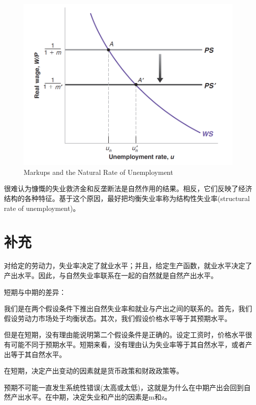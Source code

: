 \documentclass{article}
\begin{document}
\begin{figure}[H] %
	\centering %
	\includegraphics[width=1\textwidth]{7_4} %
	\caption{Markups and the Natural
		Rate of Unemployment} %
	\label{Fig.main5} %
\end{figure}

很难认为慷慨的失业救济金和反垄断法是自然作用的结果。相反，它们反映了经济结构的各种特征。基于这个原因，最好把均衡失业率称为结构性失业率(structural rate of unemployment)。

\section{补充}

对给定的劳动力，失业率决定了就业水平；并且，给定生产函数，就业水平决定了产出水平。因此，与自然失业率联系在一起的自然就是自然产出水平。

短期与中期的差异：

我们是在两个假设条件下推出自然失业率和就业与产出之间的联系的。首先，我们假设劳动力市场处于均衡状态。其次，我们假设价格水平等于其预期水平。

但是在短期，没有理由能说明第二个假设条件是正确的。设定工资时，价格水平很有可能不同于预期水平。短期来看，没有理由认为失业率等于其自然水平，或者产出等于其自然水平。

在短期，决定产出变动的因素就是货币政策和财政政策等。

预期不可能一直发生系统性错误(太高或太低)，这就是为什么在中期产出会回到自然产出水平。在中期，决定失业和产出的因素是m和z。
\end{document}
